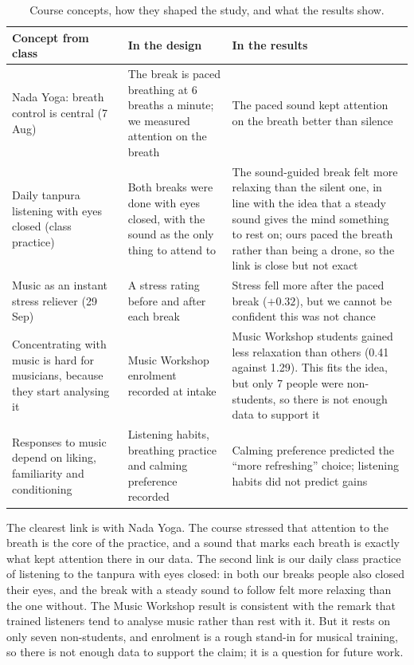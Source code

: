 \documentclass[11pt,a4paper]{article}
\begin{document}
\begin{table}[H]
\centering\small
\caption{Course concepts, how they shaped the study, and what the results show.}
\label{tab:class}
\begin{tabularx}{\textwidth}{>{\raggedright\arraybackslash}p{4.3cm}LL}
\toprule
\textbf{Concept from class} & \textbf{In the design} & \textbf{In the results}\\
\midrule
Nada Yoga: breath control is central (7 Aug) & The break is paced breathing at 6 breaths a minute; we measured attention on the breath & The paced sound kept attention on the breath better than silence\\
Daily tanpura listening with eyes closed (class practice) & Both breaks were done with eyes closed, with the sound as the only thing to attend to & The sound-guided break felt more relaxing than the silent one, in line with the idea that a steady sound gives the mind something to rest on; ours paced the breath rather than being a drone, so the link is close but not exact\\
Music as an instant stress reliever (29 Sep) & A stress rating before and after each break & Stress fell more after the paced break ($+0.32$), but we cannot be confident this was not chance\\
Concentrating with music is hard for musicians, because they start analysing it & Music Workshop enrolment recorded at intake & Music Workshop students gained less relaxation than others (0.41 against 1.29). This fits the idea, but only 7 people were non-students, so there is not enough data to support it\\
Responses to music depend on liking, familiarity and conditioning & Listening habits, breathing practice and calming preference recorded & Calming preference predicted the ``more refreshing'' choice; listening habits did not predict gains\\
\bottomrule
\end{tabularx}
\end{table}

\noindent The clearest link is with Nada Yoga. The course stressed that attention to the breath is the core of the practice, and a sound that marks each breath is exactly what kept attention there in our data. The second link is our daily class practice of listening to the tanpura with eyes closed: in both our breaks people also closed their eyes, and the break with a steady sound to follow felt more relaxing than the one without. The Music Workshop result is consistent with the remark that trained listeners tend to analyse music rather than rest with it. But it rests on only seven non-students, and enrolment is a rough stand-in for musical training, so there is not enough data to support the claim; it is a question for future work.
\end{document}
